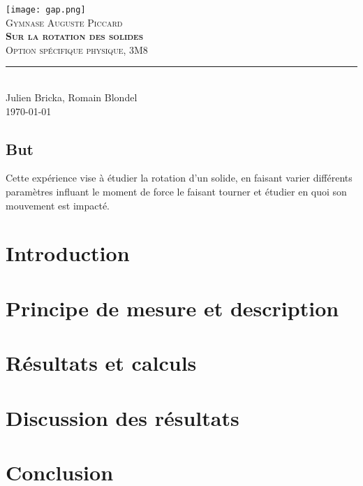 \documentclass[11pt,titlepage]{article}
\begin{document}
\begin{titlepage}
	\centering
    \texttt{[image: gap.png]}\\[0.25cm] 	%
    \textsc{\LARGE Gymnase Auguste Piccard}\\ \vspace{\fill}
    \textbf{\textsc{\fontsize{50}{50}\selectfont Sur la rotation des solides}}\\ \vspace{\fill}		
	\textsc{\LARGE Option spécifique physique, 3M8}\\[0.4cm]
	\rule{\linewidth}{0.2 mm} \\[0.5 cm]
	Julien Bricka, Romain Blondel \\[2cm] \today
\end{titlepage}
\restoregeometry

\thispagestyle{numberonly}
\begin{summary}
\section*{But}
Cette expérience vise à étudier la rotation d'un solide, en faisant varier différents paramètres influant le moment de force le faisant tourner et étudier en quoi son mouvement est impacté.
\end{summary}

\section{Introduction}


\section{Principe de mesure et description}


\section{Résultats et calculs}


\section{Discussion des résultats}


\section{Conclusion}

\end{document}
